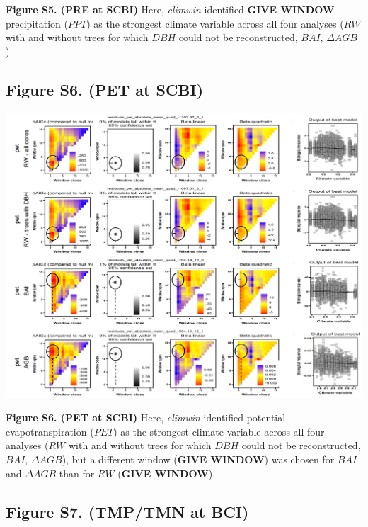 \documentclass[
]{article}
\begin{document}
\textbf{Figure S5. (PRE at SCBI)} Here, \emph{climwin} identified
\textbf{GIVE WINDOW} precipitation (\(PPT\)) as the strongest climate
variable across all four analyses (\(RW\) with and without trees for
which \(DBH\) could not be reconstructed, \(BAI\), \(\Delta AGB\)).

\newpage

\hypertarget{figure-s6.-pet-at-scbi}{%
\subsection{Figure S6. (PET at SCBI)}\label{figure-s6.-pet-at-scbi}}

\includegraphics{tables_figures/SI_figures/climwin_plots_combined/SCBI_pet.png}

\textbf{Figure S6. (PET at SCBI)} Here, \emph{climwin} identified
potential evapotranspiration (\(PET\)) as the strongest climate variable
across all four analyses (\(RW\) with and without trees for which
\(DBH\) could not be reconstructed, \(BAI\), \(\Delta AGB\)), but a
different window (\textbf{GIVE WINDOW}) was chosen for \(BAI\) and
\(\Delta AGB\) than for \(RW\) (\textbf{GIVE WINDOW}).

\newpage

\hypertarget{figure-s7.-tmptmn-at-bci}{%
\subsection{Figure S7. (TMP/TMN at
BCI)}\label{figure-s7.-tmptmn-at-bci}}
\end{document}
